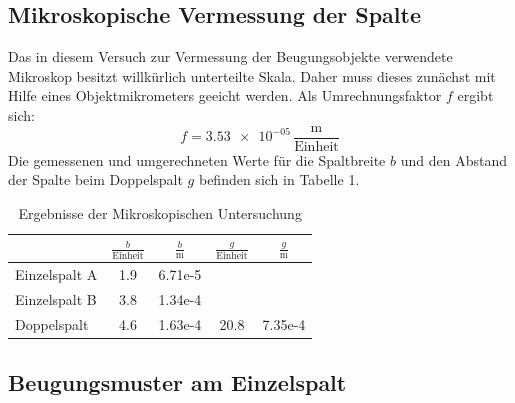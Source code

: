 \documentclass[11pt,ngerman,a4paper]{article}
\begin{document}
\subsection{Mikroskopische Vermessung der Spalte}
Das in diesem Versuch zur Vermessung der Beugungsobjekte verwendete Mikroskop besitzt willkürlich unterteilte Skala. Daher muss dieses zunächst mit Hilfe eines Objektmikrometers geeicht werden. Als Umrechnungsfaktor $f$ ergibt sich:
\[
f = \num{3.53e-05}\,\frac{\si{\meter}}{\mathrm{Einheit}}
\]
Die gemessenen und umgerechneten Werte für die Spaltbreite $b$ und den Abstand der Spalte beim Doppelspalt $g$ befinden sich in Tabelle 1.
\begin{table}[H]
\centering
\begin{tabular}{lSSSS}

\toprule
&$\frac{b}{\mathrm{Einheit}}$ & $\frac{b}{\si{\meter}}$ & $\frac{g}{\mathrm{Einheit}}$ &$\frac{g}{\si{\meter}}$\\
\midrule
Einzelspalt A & 1.9  &6.71e-5 & &\\
Einzelspalt B & 3.8  &1.34e-4 &&\\
Doppelspalt   & 4.6  & 1.63e-4&20.8&7.35e-4\\
\bottomrule
\end{tabular}
\caption{Ergebnisse der Mikroskopischen Untersuchung}
\end{table}


\subsection{Beugungsmuster am Einzelspalt}
\end{document}
